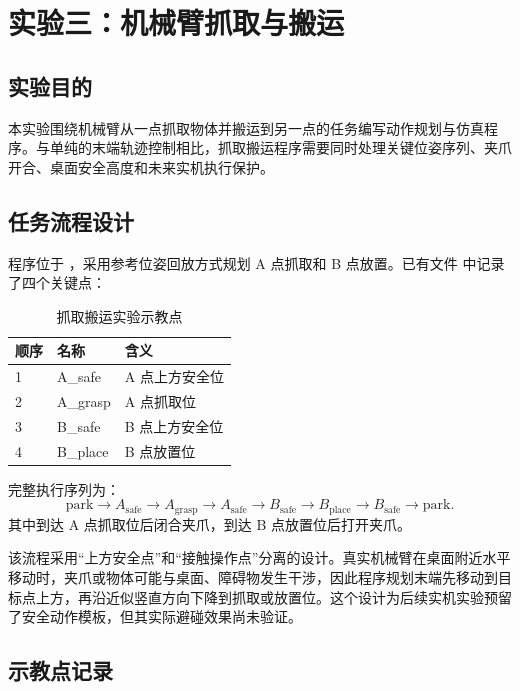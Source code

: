\section{实验三：机械臂抓取与搬运}

\subsection{实验目的}

本实验围绕机械臂从一点抓取物体并搬运到另一点的任务编写动作规划与仿真程序。与单纯的末端轨迹控制相比，抓取搬运程序需要同时处理关键位姿序列、夹爪开合、桌面安全高度和未来实机执行保护。

\subsection{任务流程设计}

程序位于 ，采用参考位姿回放方式规划 A 点抓取和 B 点放置。已有文件  中记录了四个关键点：

\begin{table}[H]
  \centering
  \caption{抓取搬运实验示教点}
  \label{tab:pick-place-points}
  \small
  \begin{tabularx}{0.82\textwidth}{L{1.5cm}L{2.5cm}Y}
    \toprule
    顺序 & 名称 & 含义 \\
     & A\_safe & A 点上方安全位 \\
    2 & A\_grasp & A 点抓取位 \\
    3 & B\_safe & B 点上方安全位 \\
    4 & B\_place & B 点放置位 \\
    \bottomrule
  \end{tabularx}
\end{table}

完整执行序列为：
\[
\text{park}\rightarrow A_{\text{safe}}\rightarrow A_{\text{grasp}}\rightarrow
A_{\text{safe}}\rightarrow B_{\text{safe}}\rightarrow B_{\text{place}}\rightarrow
B_{\text{safe}}\rightarrow \text{park}.
\]
其中到达 A 点抓取位后闭合夹爪，到达 B 点放置位后打开夹爪。

该流程采用“上方安全点”和“接触操作点”分离的设计。真实机械臂在桌面附近水平移动时，夹爪或物体可能与桌面、障碍物发生干涉，因此程序规划末端先移动到目标点上方，再沿近似竖直方向下降到抓取或放置位。这个设计为后续实机实验预留了安全动作模板，但其实际避碰效果尚未验证。

\subsection{示教点记录}

